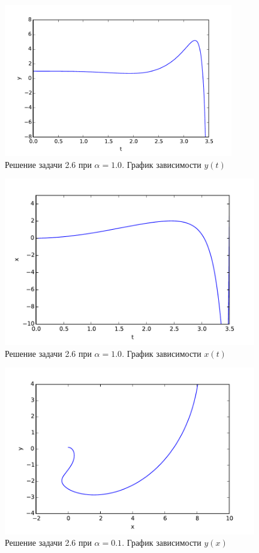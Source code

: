 \documentclass[a4paper,14pt]{article}
\begin{document}
\begin{figure}[H]
\centering
    \includegraphics[width=100mm]{pictures/10t-y.pdf}
    \caption{Решение задачи 2.6 при $\alpha = 1.0$. График зависимости $y(t)$}
    \label{myt-y} 
\end{figure}
\begin{figure}[H]
\centering
    \includegraphics[width=110mm]{pictures/10t-x.pdf}
    \caption{Решение задачи 2.6 при $\alpha = 1.0$. График зависимости $x(t)$}
    \label{myt-x}
\end{figure}
\begin{figure}[H]
\centering
    \includegraphics[width=110mm]{pictures/01x-y.pdf}
    \caption{Решение задачи 2.6 при $\alpha = 0.1$. График зависимости $y(x)$}
    \label{1myx-y}
\end{figure}
\end{document}

